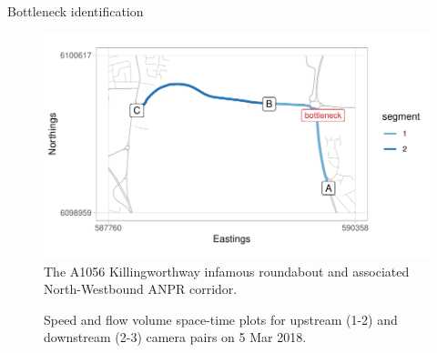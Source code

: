 \documentclass[final]{beamer}
\newlength{\colwidth}
\begin{document}
\begin{frame}[t]
\begin{columns}[t]
\begin{column}{\colwidth}
\begin{block}{Bottleneck identification }
    \begin{figure}
      \centering
      \includegraphics[width=0.55\linewidth]{MOTIVATING-EXAMPLE-map.pdf}
      \caption{The A1056 Killingworthway infamous roundabout and associated
              North-Westbound ANPR corridor.}
      \label{fig:motivating_example_map}
    \end{figure}

    \vspace{-0.75cm}

    \begin{figure}
      \centering
      \caption{Speed and flow volume space-time plots for upstream
               (1-2) and downstream (2-3) camera pairs on 5 Mar 2018.}
      \label{fig:motivating_example_1dayplots}
    \end{figure}

    \vspace{-0.75cm}




\end{block}
\end{column}
\end{columns}
\end{frame}
\end{document}
